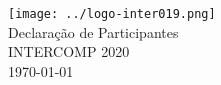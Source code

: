 \begin{center}

	\vspace*{\fill}
	{\let\clearpage\relax \texttt{[image: ../logo-inter019.png]} \\ [.5cm]}
	\Huge{Declaração de Participantes} \\ [.5cm]
	\Large{INTERCOMP 2020} \\ [.5cm]
	\normalsize{\today}
	\vspace*{\fill}

\end{center}
